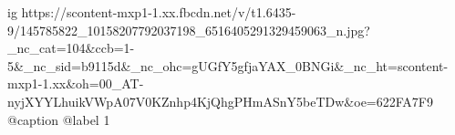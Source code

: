  
 
 
 
 

\ifcmt
  ig https://scontent-mxp1-1.xx.fbcdn.net/v/t1.6435-9/145785822_10158207792037198_6516405291329459063_n.jpg?_nc_cat=104&ccb=1-5&_nc_sid=b9115d&_nc_ohc=gUGfY5gfjaYAX_0BNGi&_nc_ht=scontent-mxp1-1.xx&oh=00_AT-nyjXYYLhuikVWpA07V0KZnhp4KjQhgPHmASnY5beTDw&oe=622FA7F9
  @caption @label 1
\fi
